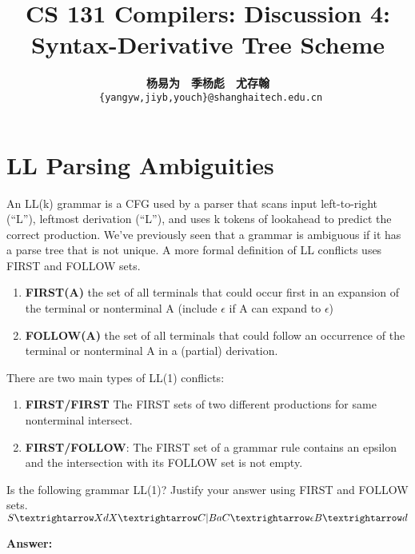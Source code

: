 \documentclass[a4paper]{article}
\title{CS 131 Compilers: Discussion 4: Syntax-Derivative Tree Scheme}
\author{\textbf{杨易为}~~\textbf{季杨彪}~~\textbf{尤存翰} \\ \texttt{ \{yangyw,jiyb,youch\}@shanghaitech.edu.cn}}
\theoremstyle{definition}
\begin{document}
\maketitle
\section{LL Parsing Ambiguities}
 An LL(k) grammar is a CFG used by a parser that scans
input left-to-right (“L”), leftmost derivation (“L”), and uses k tokens of lookahead to
predict the correct production. We’ve previously seen that a grammar is ambiguous
if it has a parse tree that is not unique. A more formal definition of LL conflicts uses
FIRST and FOLLOW sets.

\begin{enumerate}
  \item \textbf{FIRST(A)}  the set of all terminals that could occur first in an expansion of
  the terminal or nonterminal A (include $\epsilon$ if A can expand to $\epsilon$)
  \item \textbf{FOLLOW(A)}  the set of all terminals that could follow an occurrence of the
  terminal or nonterminal A in a (partial) derivation.
\end{enumerate}

There are two main types of LL(1) conflicts:
\begin{enumerate}
  \item \textbf{FIRST/FIRST} The FIRST sets of two different productions for same nonterminal intersect.
  \item \textbf{FIRST/FOLLOW}: The FIRST set of a grammar rule contains an epsilon and
  the intersection with its FOLLOW set is not empty.

\end{enumerate}

Is the following grammar LL(1)? Justify your answer using FIRST and FOLLOW sets.
\\
$S → Xd\\  X → C | Ba\\ C →\epsilon \\B → d$

\textbf{Answer:}
\end{document}
